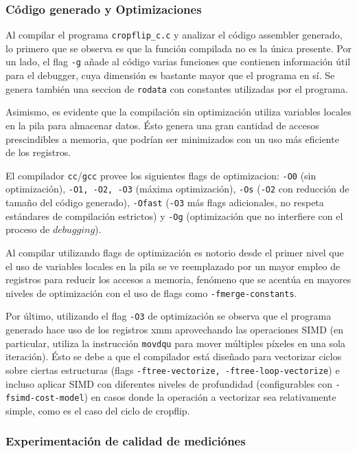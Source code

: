 \documentclass[a4paper]{article}
\begin{document}
\subsubsection{Código generado y Optimizaciones}

Al compilar el programa \texttt{cropflip_c.c} y analizar el código assembler generado, lo primero que se observa es que la función compilada no es la única presente. Por un lado, el flag \texttt{-g} añade al código varias funciones que contienen información útil para el debugger, cuya dimensión es bastante mayor que el programa en sí. Se genera también una seccion de \texttt{rodata} con constantes utilizadas por el programa.

Asimismo, es evidente que la compilación sin optimización utiliza variables locales en la pila para almacenar datos. Ésto genera una gran cantidad de accesos prescindibles a memoria, que podrían ser minimizados con un uso más eficiente de los registros.

El compilador \texttt{cc}/\texttt{gcc} provee los siguientes flags de optimizacion: \texttt{-O0} (sin optimización), \texttt{-O1, -O2, -O3} (máxima optimización), \texttt{-Os} (\texttt{-O2} con reducción de tamaño del código generado), \texttt{-Ofast} (\texttt{-O3} más flags adicionales, no respeta estándares de compilación estrictos) y \texttt{-Og} (optimización que no interfiere con el proceso de $debugging$).

Al compilar utilizando flags de optimización es notorio desde el primer nivel que el uso de variables locales en la pila se ve reemplazado por un mayor empleo de registros para reducir los accesos a memoria, fenómeno que se acentúa en mayores niveles de optimización con el uso de flags como \texttt{-fmerge-constants}.

Por último, utilizando el flag \texttt{-O3} de optimización se observa que el programa generado hace uso de los registros xmm aprovechando las operaciones SIMD (en particular, utiliza la instrucción \texttt{movdqu} para mover múltiples píxeles en una sola iteración). Ésto se debe a que el compilador está diseñado para vectorizar ciclos sobre ciertas estructuras (flags \texttt{-ftree-vectorize, -ftree-loop-vectorize}) e incluso aplicar SIMD con diferentes niveles de profundidad (configurables con \texttt{-fsimd-cost-model}) en casos donde la operación a vectorizar sea relativamente simple, como es el caso del ciclo de cropflip.

\subsubsection{Experimentación de calidad de mediciónes}
\end{document}
